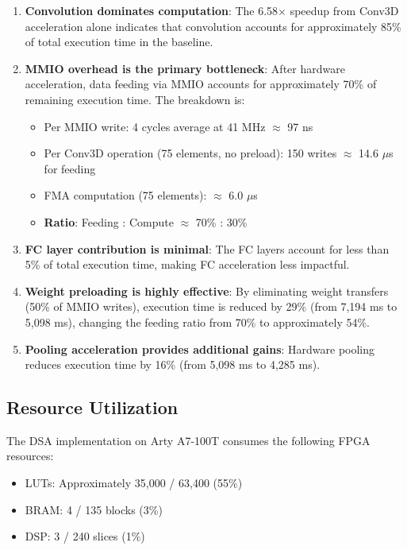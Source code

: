 \documentclass[conference]{IEEEtran}
\begin{document}
\begin{enumerate}
    \item \textbf{Convolution dominates computation}: The 6.58$\times$ speedup from Conv3D acceleration alone indicates that convolution accounts for approximately 85\% of total execution time in the baseline.
    
    \item \textbf{MMIO overhead is the primary bottleneck}: After hardware acceleration, data feeding via MMIO accounts for approximately 70\% of remaining execution time. The breakdown is:
    \begin{itemize}
        \item Per MMIO write: 4 cycles average at 41 MHz $\approx$ 97 ns
        \item Per Conv3D operation (75 elements, no preload): 150 writes $\approx$ 14.6 $\mu$s for feeding
        \item FMA computation (75 elements): $\approx$ 6.0 $\mu$s
        \item \textbf{Ratio}: Feeding : Compute $\approx$ 70\% : 30\%
    \end{itemize}
    
    \item \textbf{FC layer contribution is minimal}: The FC layers account for less than 5\% of total execution time, making FC acceleration less impactful.
    
    \item \textbf{Weight preloading is highly effective}: By eliminating weight transfers (50\% of MMIO writes), execution time is reduced by 29\% (from 7,194 ms to 5,098 ms), changing the feeding ratio from 70\% to approximately 54\%.
    
    \item \textbf{Pooling acceleration provides additional gains}: Hardware pooling reduces execution time by 16\% (from 5,098 ms to 4,285 ms).
\end{enumerate}

\subsection{Resource Utilization}

The DSA implementation on Arty A7-100T consumes the following FPGA resources:

\begin{itemize}
    \item LUTs: Approximately 35,000 / 63,400 (55\%)
    \item BRAM: 4 / 135 blocks (3\%)
    \item DSP: 3 / 240 slices (1\%)
\end{itemize}
\end{document}
